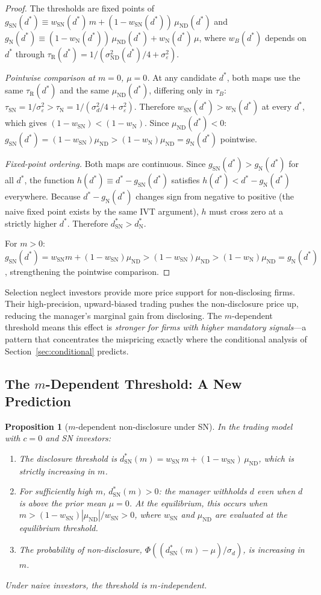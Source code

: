 \documentclass[12pt]{article}
\theoremstyle{plain}
\newtheorem{proposition}{Proposition}
\theoremstyle{definition}
\newcommand{\ND}{\mathrm{ND}}
\newcommand{\R}{\mathrm{R}}
\newcommand{\SN}{\mathrm{SN}}
\newcommand{\N}{\mathrm{N}}
\begin{document}
\begin{proof}
The thresholds are fixed points of $g_\SN(d^*) \equiv w_\SN(d^*)\,m + (1-w_\SN(d^*))\,\mu_{\ND}(d^*)$ and $g_\N(d^*) \equiv (1-w_\N(d^*))\,\mu_{\ND}(d^*) + w_\N(d^*)\,\mu$, where $w_B(d^*)$ depends on $d^*$ through $\tau_\R(d^*) = 1/(\sigma_{\ND}^2(d^*)/4 + \sigma_\varepsilon^2)$.

\emph{Pointwise comparison at $m = 0$, $\mu = 0$.} At any candidate $d^*$, both maps use the same $\tau_\R(d^*)$ and the same $\mu_{\ND}(d^*)$, differing only in $\tau_B$: $\tau_\SN = 1/\sigma_\varepsilon^2 > \tau_\N = 1/(\sigma_d^2/4 + \sigma_\varepsilon^2)$. Therefore $w_\SN(d^*) > w_\N(d^*)$ at every $d^*$, which gives $(1-w_\SN) < (1-w_\N)$. Since $\mu_{\ND}(d^*) < 0$: $g_\SN(d^*) = (1-w_\SN)\mu_{\ND} > (1-w_\N)\mu_{\ND} = g_\N(d^*)$ pointwise.

\emph{Fixed-point ordering.} Both maps are continuous. Since $g_\SN(d^*) > g_\N(d^*)$ for all $d^*$, the function $h(d^*) \equiv d^* - g_\SN(d^*)$ satisfies $h(d^*) < d^* - g_\N(d^*)$ everywhere. Because $d^* - g_\N(d^*)$ changes sign from negative to positive (the naive fixed point exists by the same IVT argument), $h$ must cross zero at a strictly higher $d^*$. Therefore $d^*_\SN > d^*_\N$.

For $m > 0$: $g_\SN(d^*) = w_\SN m + (1-w_\SN)\mu_{\ND} > (1-w_\SN)\mu_{\ND} > (1-w_\N)\mu_{\ND} = g_\N(d^*)$, strengthening the pointwise comparison.
\end{proof}

Selection neglect investors provide more price support for non-disclosing firms. Their high-precision, upward-biased trading pushes the non-disclosure price up, reducing the manager's marginal gain from disclosing. The $m$-dependent threshold means this effect is \emph{stronger for firms with higher mandatory signals}---a pattern that concentrates the mispricing exactly where the conditional analysis of Section~\ref{sec:conditional} predicts.

\subsection{The $m$-Dependent Threshold: A New Prediction}

\begin{proposition}[$m$-dependent non-disclosure under SN]
\label{prop:m_dependent_trading}
In the trading model with $c = 0$ and SN investors:
\begin{enumerate}[nosep]
\item The disclosure threshold is $d^*_\SN(m) = w_\SN\,m + (1-w_\SN)\,\mu_{\ND}$, which is strictly increasing in $m$.
\item For sufficiently high $m$, $d^*_\SN(m) > 0$: the manager withholds $d$ even when $d$ is \emph{above} the prior mean $\mu = 0$. At the equilibrium, this occurs when $m > (1-w_\SN)|\mu_{\ND}|/w_\SN > 0$, where $w_\SN$ and $\mu_{\ND}$ are evaluated at the equilibrium threshold.
\item The probability of non-disclosure, $\Phi((d^*_\SN(m) - \mu)/\sigma_d)$, is increasing in $m$.
\end{enumerate}
Under naive investors, the threshold is $m$-independent.
\end{proposition}
\end{document}
